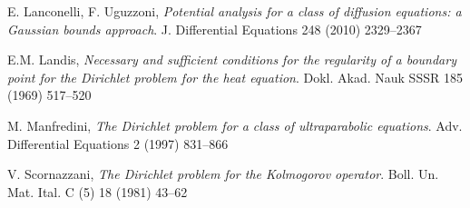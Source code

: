 \documentclass[10pt]{amsart}
\numberwithin{equation}{section}
\begin{document}
\begin{thebibliography}{10}
E. Lanconelli, F. Uguzzoni,
\textit{Potential analysis for a class of diffusion equations: a Gaussian bounds approach}.
J. Differential Equations 248 (2010) 2329--2367

E.M. Landis,
\textit{Necessary and sufficient conditions for the regularity of a boundary point for the Dirichlet problem for the heat equation}.
 Dokl. Akad. Nauk SSSR 185 (1969) 517--520

M. Manfredini,
\textit{The Dirichlet problem for a class of ultraparabolic equations}.
Adv. Differential Equations 2 (1997) 831--866

V. Scornazzani,
\textit{The Dirichlet problem for the Kolmogorov operator}.
Boll. Un. Mat. Ital. C (5) 18 (1981) 43--62

\end{thebibliography}
\end{document}

